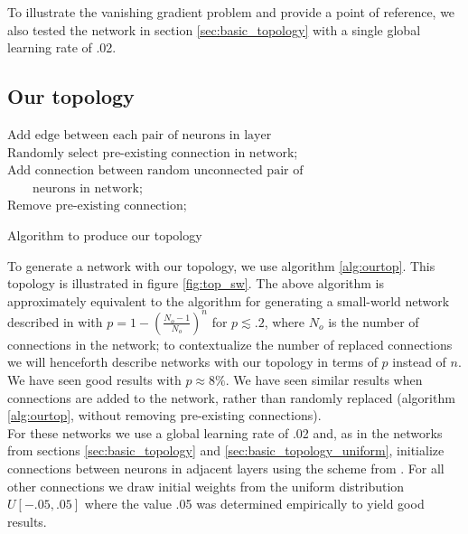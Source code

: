 \documentclass[format=sigconf]{acmart}
\newcommand{\npar}{\\\indent}
\begin{document}
To illustrate the vanishing gradient problem and provide a point of reference, we also tested the network in section \ref{sec:basic_topology} with a single global learning rate of .02.

\subsection{Our topology}
\label{sec:our_topology}


\begin{algorithm}
{
	$\text{Add edge between each pair of neurons in layer}$
}
{
	$\text{Randomly select pre-existing connection in network}$;\\
	$\text{Add connection between random unconnected pair of}$\\
	$\qquad\text{neurons in network}$;\\
	$\text{Remove pre-existing connection}$;
}

\caption{Algorithm to produce our topology}
\label{alg:ourtop}
\end{algorithm}

To generate a network with our topology, we use algorithm \ref{alg:ourtop}. This topology is illustrated in figure \ref{fig:top_sw}. The above algorithm is approximately equivalent to the algorithm for generating a small-world network described in \citep{watts98} with $p=1-(\frac{N_o-1}{N_o})^n$ for $p\lesssim .2$, where $N_o$ is the number of connections in the network; to contextualize the number of replaced connections we will henceforth describe networks with our topology in terms of $p$ instead of $n$. We have seen good results with $p\approx 8\%$. We have seen similar results when connections are added to the network, rather than randomly replaced (algorithm \ref{alg:ourtop}, without removing pre-existing connections).
\npar
For these networks we use a global learning rate of .02 and, as in the networks from sections \ref{sec:basic_topology} and \ref{sec:basic_topology_uniform}, initialize connections between neurons in adjacent layers using the scheme from \cite{glorot2010}. For all other connections we draw initial weights from the uniform distribution $U[-.05, .05]$ where the value .05 was determined empirically to yield good results.
\end{document}
